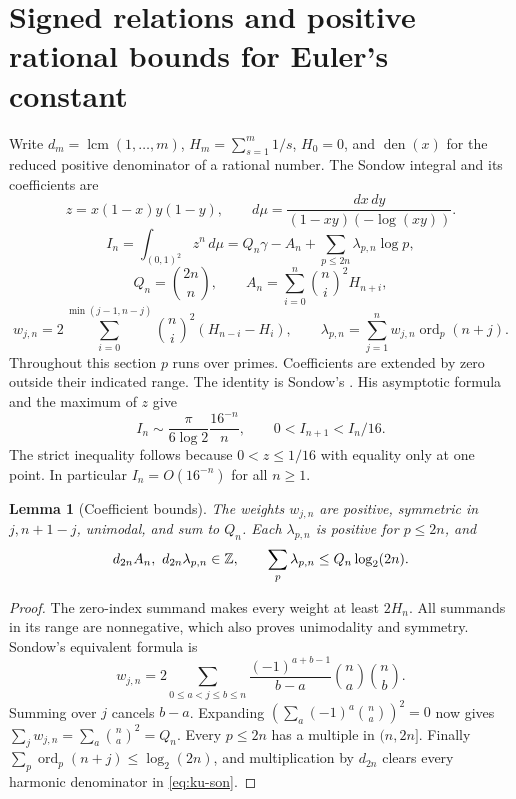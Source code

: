 \documentclass[11pt,a4paper]{article}
\newtheorem{lemma}[theorem]{Lemma}\newtheorem{proposition}[theorem]{Proposition}\newtheorem{corollary}[theorem]{Corollary}
\theoremstyle{definition}\newtheorem{definition}[theorem]{Definition}\newtheorem{example}[theorem]{Example}
\theoremstyle{remark}\newtheorem{remark}[theorem]{Remark}
\begin{document}
\section{Signed relations and positive rational bounds for Euler's constant}
\label{sec:ku-den}
Write $d_m=\operatorname{lcm}(1,\ldots,m)$, $H_m=\sum_{s=1}^m1/s$,
$H_0=0$, and $\operatorname{den}(x)$ for the reduced positive denominator
of a rational number. The Sondow integral and its coefficients are
\[
 z=x(1-x)y(1-y),\qquad d\mu=\frac{dx\,dy}{(1-xy)(-\log(xy))}.
\]
\begin{equation}
 I_n=\int_{(0,1)^2}z^n\,d\mu
     =Q_n\gamma-A_n+\sum_{p\le2n}\lambda_{p,n}\log p,
 \label{eq:ku-son}
\end{equation}
\[
 Q_n=\binom{2n}{n},\qquad A_n=\sum_{i=0}^n\binom ni^2 H_{n+i},
\]
\[
 w_{j,n}=2\sum_{i=0}^{\min(j-1,n-j)}\binom ni^2(H_{n-i}-H_i),\qquad
 \lambda_{p,n}=\sum_{j=1}^nw_{j,n}\operatorname{ord}_p(n+j).
\]
Throughout this section $p$ runs over primes. Coefficients are extended by
zero outside their indicated range. The identity is Sondow's
\cite[Theorem~1]{Sondow}. His asymptotic formula and the maximum of $z$ give
\begin{equation}
 I_n\sim\frac{\pi}{6\log2}\frac{16^{-n}}{n},
 \qquad 0<I_{n+1}< I_n/16 .
 \label{eq:ku-lap}
\end{equation}
The strict inequality follows because $0<z\le1/16$ with equality only at
one point. In particular $I_n=O(16^{-n})$ for all $n\ge1$.

\begin{lemma}[Coefficient bounds]\label{lem:ku-weights}
The weights $w_{j,n}$ are positive, symmetric in $j,n+1-j$, unimodal, and
sum to $Q_n$. Each $\lambda_{p,n}$ is positive for $p\le2n$, and
\[
 d_{2n}A_n,\ d_{2n}\lambda_{p,n}\in\Z,\qquad
 \sum_p\lambda_{p,n}\le Q_n\log_2(2n).
\]
\end{lemma}
\begin{proof}
The zero-index summand makes every weight at least $2H_n$. All summands
in its range are nonnegative, which also proves unimodality and symmetry.
Sondow's equivalent formula \cite[(11) and the proof of Lemma~2]{Sondow} is
\[
 w_{j,n}=2\sum_{0\le a<j\le b\le n}
          \frac{(-1)^{a+b-1}}{b-a}\binom na\binom nb .
\]
Summing over $j$ cancels $b-a$. Expanding
$(\sum_a(-1)^a\binom na)^2=0$ now gives $\sum_jw_{j,n}=\sum_a\binom na^2=Q_n$.
Every $p\le2n$ has a multiple in $(n,2n]$. Finally
$\sum_p\operatorname{ord}_p(n+j)\le\log_2(2n)$, and multiplication by
$d_{2n}$ clears every harmonic denominator in \eqref{eq:ku-son}.
\end{proof}
\end{document}
